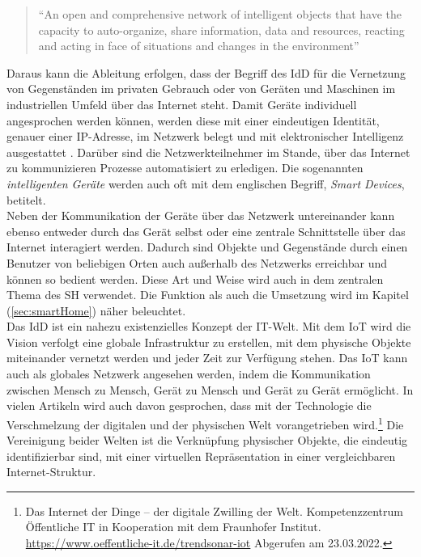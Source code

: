     \pagebreak
    \begin{quote}
        “An open and comprehensive network of intelligent objects that have the capacity to auto-organize, share information, data 
        and resources, reacting and acting in face of situations and changes in the environment” \cite{Madakam2015}
    \end{quote}
    Daraus kann die Ableitung erfolgen, dass der Begriff des \acl{IdD} für die Vernetzung von Gegenständen im privaten Gebrauch oder 
    von Geräten und Maschinen im industriellen Umfeld über das Internet steht. Damit Geräte individuell angesprochen werden können, werden diese 
    mit einer eindeutigen Identität, genauer einer \ac{IP}-Adresse, im Netzwerk belegt und mit elektronischer Intelligenz ausgestattet \cite{bigdatainsider2016}.
    Darüber sind die Netzwerkteilnehmer im Stande, über das Internet zu kommunizieren Prozesse automatisiert zu erledigen. Die sogenannten 
    \textit{intelligenten Geräte} werden auch oft mit dem englischen Begriff, \textit{Smart Devices}, betitelt. 
    \\
    \linebreak
    Neben der Kommunikation der Geräte über das Netzwerk untereinander kann ebenso entweder durch das Gerät selbst oder eine zentrale 
    Schnittstelle über das Internet interagiert werden. Dadurch sind Objekte und Gegenstände durch einen Benutzer von beliebigen Orten 
    auch außerhalb des Netzwerks erreichbar und können so bedient werden. Diese Art und Weise wird auch in dem zentralen Thema des 
    \acl{SH} verwendet. Die Funktion als auch die Umsetzung wird im Kapitel (\ref{sec:smartHome}) näher beleuchtet.
    \\
    \linebreak
    Das \acl{IdD} ist ein nahezu existenzielles Konzept der \acs{IT}-Welt. Mit dem \acs{IoT} wird die Vision verfolgt eine globale 
    Infrastruktur zu erstellen, mit dem physische Objekte miteinander vernetzt werden und jeder Zeit zur Verfügung stehen. Das \acl{IoT} 
    kann auch als globales Netzwerk angesehen werden, indem die Kommunikation zwischen Mensch zu Mensch, Gerät zu Mensch und Gerät zu 
    Gerät ermöglicht. In vielen Artikeln wird auch davon gesprochen, dass mit der Technologie die Verschmelzung der digitalen und 
    der physischen Welt vorangetrieben wird.\footnote{Das Internet der Dinge – der digitale Zwilling der Welt. Kompetenzzentrum Öffentliche IT in Kooperation mit dem Fraunhofer Institut. \url{https://www.oeffentliche-it.de/trendsonar-iot} Abgerufen am 23.03.2022.} 
    Die Vereinigung beider Welten ist die Verknüpfung physischer Objekte, die eindeutig identifizierbar sind, mit einer virtuellen 
    Repräsentation in einer vergleichbaren Internet-Struktur. 


